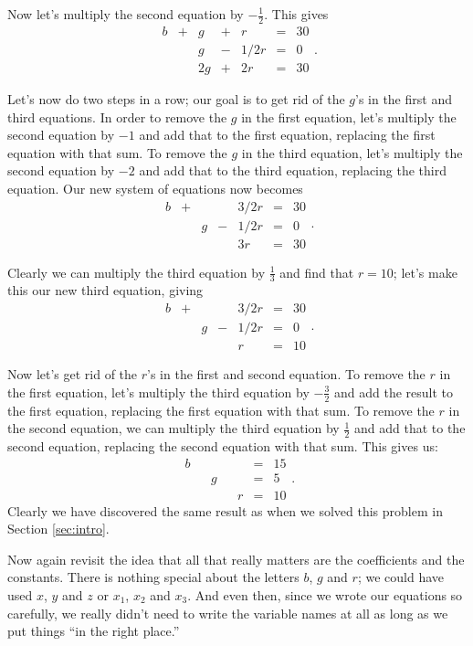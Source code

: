 Now let's multiply the second equation by $-\frac12$. This gives $$\begin{array}{ccccccc}
b&+&g&+&r&=&30\\
 & & g&-&1/2r&=&0\\
 & &2g&+&2r&=&30
\end{array}.$$

Let's now do two steps in a row; our goal is to get rid of the $g$'s in the first and third equations. In order to remove the $g$ in the first equation, let's multiply the second equation by $-1$ and add that to the first equation, replacing the first equation with that sum. To remove the $g$ in the third equation, let's multiply the second equation by $-2$ and add that to the third equation, replacing the third equation. Our new system of equations now becomes
$$\begin{array}{ccccccc}
b&+& & &3/2r&=&30\\
 & &g&-&1/2r&=&0\\
 & & & &3r&=&30
\end{array}.$$

Clearly we can multiply the third equation by $\frac13$ and find that $r=10$; let's make this our new third equation, giving
$$\begin{array}{ccccccc}
b&+& & &3/2r&=&30\\
 & &g&-&1/2r&=&0\\
 & & & &r&=&10
\end{array}.$$

Now let's get rid of the $r$'s in the first and second equation. To remove the $r$ in the first equation, let's multiply the third equation by $-\frac32$ and add the result to the first equation, replacing the first equation with that sum. To remove the $r$ in the second equation, we can multiply the third equation by $\frac12$ and add that to the second equation, replacing the second equation with that sum. This gives us:
$$\begin{array}{ccccccc}
b& & & & &=&15\\
 & &g& & &=&5\\
 & & & &r&=&10
\end{array}.$$
Clearly we have discovered the same result as when we solved this problem in Section \ref{sec:intro}. 

Now again revisit the idea that all that really matters are the coefficients and the constants. There is nothing special about the letters $b$, $g$ and $r$; we could have used $x$, $y$ and $z$ or $x_1$, $x_2$ and $x_3$. And even then, since we wrote our equations so carefully, we really didn't need to write the variable names at all as long as we put things ``in the right place.''

